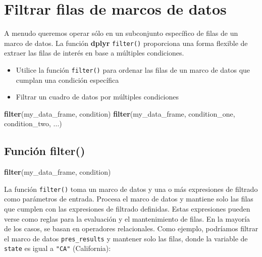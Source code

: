 \documentclass[
]{book}
\newenvironment{Shaded}{\begin{snugshade}}{\end{snugshade}}
\newcommand{\KeywordTok}[1]{\textcolor[rgb]{0.13,0.29,0.53}{\textbf{#1}}}
\newcommand{\NormalTok}[1]{#1}
\providecommand{\tightlist}{%
  \setlength{\itemsep}{0pt}\setlength{\parskip}{0pt}}
\begin{document}
\hypertarget{filtrar-filas-de-marcos-de-datos}{%
\section{Filtrar filas de marcos de datos}\label{filtrar-filas-de-marcos-de-datos}}

A menudo queremos operar sólo en un subconjunto específico de filas de un marco de datos. La función \textbf{dplyr} \texttt{filter()} proporciona una forma flexible de extraer las filas de interés en base a múltiples condiciones.

\begin{itemize}
\tightlist
\item
  Utilice la función \texttt{filter()} para ordenar las filas de un marco de datos que cumplan una condición específica
\item
  Filtrar un cuadro de datos por múltiples condiciones
\end{itemize}

\begin{Shaded}
\begin{Highlighting}[]
\KeywordTok{filter}\NormalTok{(my_data_frame, condition)}
\KeywordTok{filter}\NormalTok{(my_data_frame, condition_one, condition_two, ...)}
\end{Highlighting}
\end{Shaded}

\hypertarget{funciuxf3n-filter}{%
\subsection{Función filter()}\label{funciuxf3n-filter}}

\begin{Shaded}
\begin{Highlighting}[]
\KeywordTok{filter}\NormalTok{(my_data_frame, condition)}
\end{Highlighting}
\end{Shaded}

La función \texttt{filter()} toma un marco de datos y una o más expresiones de filtrado como parámetros de entrada. Procesa el marco de datos y mantiene solo las filas que cumplen con las expresiones de filtrado definidas. Estas expresiones pueden verse como reglas para la evaluación y el mantenimiento de filas. En la mayoría de los casos, se basan en operadores relacionales. Como ejemplo, podríamos filtrar el marco de datos \texttt{pres\_results} y mantener solo las filas, donde la variable de \texttt{state} es igual a \texttt{"CA"} (California):
\end{document}
